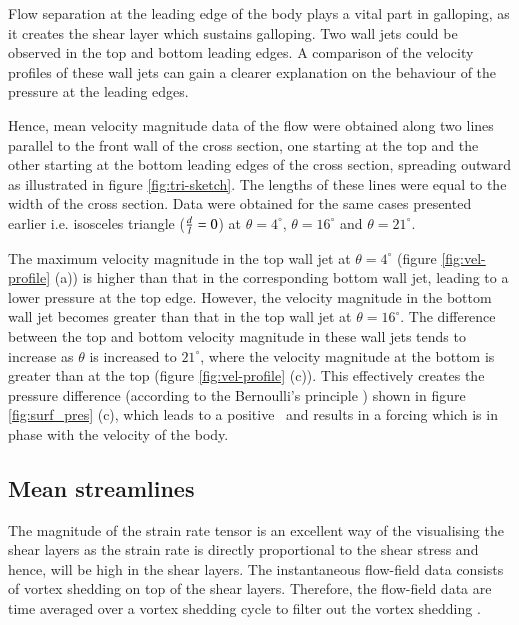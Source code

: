 Flow separation at the leading edge of the body plays a vital part in galloping, as it creates the shear layer which sustains galloping. Two wall jets could be observed in the top and bottom leading edges. A comparison of the velocity profiles of these wall jets can gain a clearer explanation on the behaviour of the pressure at the leading edges.   



Hence, mean velocity magnitude data of the flow were obtained along two lines parallel to the front wall of the cross section, one starting at the top and the other starting at the bottom leading edges of the cross section, spreading outward as illustrated in figure \ref{fig:tri-sketch}. The lengths of these lines were equal to the width of the cross section. Data were obtained for the same cases presented earlier i.e. isosceles triangle ($\frac{d}{l}=0$) at $\theta=4^{\circ}$, $\theta=16^{\circ}$ and $\theta=21^{\circ}$.  







The maximum velocity magnitude in the top wall jet at $\theta= 4^{\circ}$ (figure \ref{fig:vel-profile} (a)) is higher than that in the corresponding bottom wall jet, leading to a lower pressure at the top edge. However, the velocity magnitude in the bottom wall jet becomes greater than that in the top wall jet at $\theta=16^{\circ}$. The difference between the top and bottom velocity magnitude in these wall jets tends to increase as $\theta$ is increased to $21^{\circ}$, where the velocity magnitude at the bottom is greater than at the top (figure \ref{fig:vel-profile} (c)). This effectively creates the pressure difference (according to the Bernoulli's principle ) shown in figure \ref{fig:surf_pres} (c), which leads to a positive \cy\ and results in a forcing which is in phase with the velocity of the body. 



\subsection{Mean streamlines}
\label{sec:streamlines}

The magnitude of the strain rate tensor is an excellent way of the visualising the shear layers as the strain rate is directly proportional to the shear stress and hence, will be high in the shear layers. The instantaneous flow-field data consists of vortex shedding on top of the shear layers. Therefore, the flow-field data are time averaged over a vortex shedding cycle to filter out the vortex shedding . 

